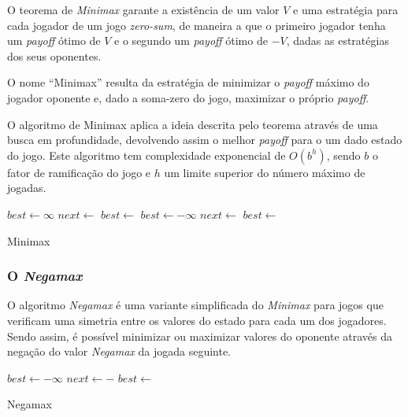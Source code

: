 \documentclass[12pt,a4paper,oneside]{article}
\begin{document}
O teorema de \textit{Minimax} garante a existência de um valor $V$ e
uma estratégia para cada jogador de um jogo \emph{zero-sum}, de
maneira a que o primeiro jogador tenha um \emph{payoff} ótimo de $V$ e
o segundo um \emph{payoff} ótimo de $-V$, dadas as estratégias dos
seus oponentes.

O nome ``Minimax'' resulta da estratégia de minimizar o \emph{payoff}
máximo do jogador oponente e, dado a soma-zero do jogo, maximizar o
próprio \emph{payoff}.

O algoritmo de Minimax aplica a ideia descrita pelo teorema através de
uma busca em profundidade, devolvendo assim o melhor \emph{payoff}
para o um dado estado do jogo. Este algoritmo tem complexidade
exponencial de $O(b^{h})$, sendo $b$ o fator de ramificação do jogo e
$h$ um limite superior do número máximo de jogadas.

\begin{algorithm}
\begin{algorithmic}
 
   
  \EndIf
      \State $best \gets \infty$
          \State $next \gets$ 
          \State $best \gets$ 
      \EndFor
      \State $best \gets -\infty$
          \State $next \gets$ 
          \State $best \gets$ 
      \EndFor
  \EndIf
  \State{} 
\EndFunction
\end{algorithmic}
\caption{Minimax}
\end{algorithm}

\subsubsection{O \textit{Negamax}}

O algoritmo \textit{Negamax} é uma variante simplificada do \textit{Minimax} para jogos
que verificam uma simetria entre os valores do estado para cada um dos
jogadores. Sendo assim, é possível minimizar ou maximizar valores do
oponente através da negação do valor \textit{Negamax} da jogada seguinte.

\begin{algorithm}
\begin{algorithmic}
 
   
  \EndIf
  \State $best \gets -\infty$
      \State $next \gets -$
      \State $best \gets$ 
  \EndFor
  \State{} 
\EndFunction
\end{algorithmic}
\caption{Negamax}
\end{algorithm}
\end{document}
